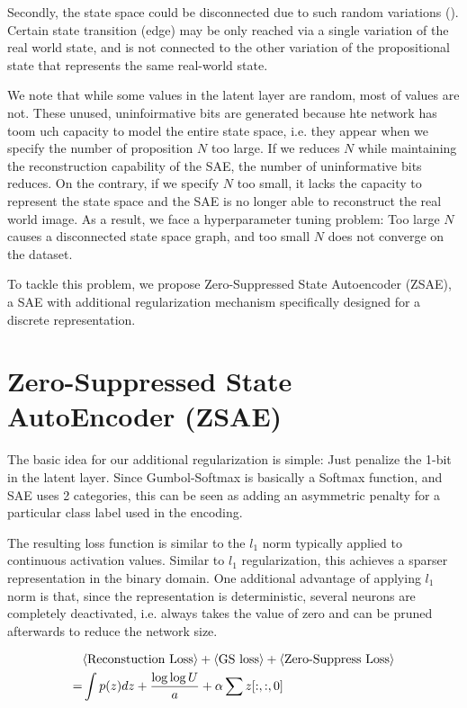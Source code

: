 Secondly, the state space could be disconnected due to such random variations ().
Certain state transition (edge) may be only reached via a single variation of the real world state, and is not connected to the
other variation of the propositional state that represents the same real-world state.

We note that while some values in the latent layer are random, most of values are not.
These unused, uninfoirmative bits are generated because hte network has toom uch capacity to 
model the entire state space, i.e. they appear when we specify the number of proposition $N$ too large.
If we reduces $N$ while maintaining the reconstruction capability of the SAE, the number of uninformative bits
reduces.
On the contrary, if we specify $N$ too small, it lacks the capacity to represent the state space
and the SAE is no longer able to reconstruct the
real world image.
As a result, we face a hyperparameter tuning problem: Too large $N$ causes a disconnected state space graph,
and too small $N$ does not converge on the dataset.

To tackle this problem, we propose Zero-Suppressed State Autoencoder (ZSAE),
a SAE with additional regularization mechanism specifically designed for a discrete representation.

\section{Zero-Suppressed State AutoEncoder (ZSAE)}
\label{zsae}

The basic idea for our additional regularization is simple: Just penalize the
1-bit in the latent layer. Since Gumbol-Softmax is basically a Softmax function,
and SAE uses 2 categories, this can be seen as adding an
asymmetric penalty for a particular class label used in the encoding.

The resulting loss function is similar to the $l_1$ norm typically
applied to continuous activation values.
Similar to $l_1$ regularization, this achieves a sparser representation in the binary domain.
One additional advantage of applying $l_1$ norm is that, since the representation is deterministic,
several neurons are completely deactivated, i.e. always takes the value of zero
and can be pruned afterwards to reduce the network size.

\begin{align*}
  &{\left<\text{Reconstuction Loss}\right>} + {\left<\text{GS loss}\right>} + {\left<\text{Zero-Suppress Loss}\right>} \\ 
 =& \int p(z)dz + \frac{\log {\log{U}}}{a} + \alpha \sum z[:,:,0]
\end{align*}

